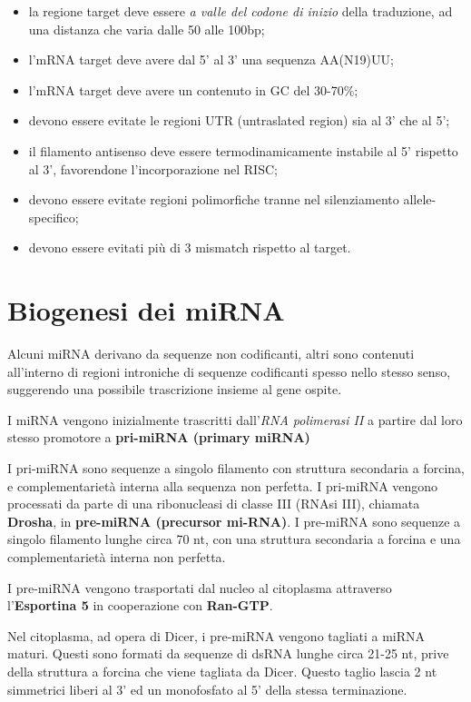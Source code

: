 \documentclass[11pt]{book}
\begin{document}
\begin{itemize}
\itemsep1pt\parskip0pt
\item
  la regione target deve essere \emph{a valle del codone di inizio}
  della traduzione, ad una distanza che varia dalle 50 alle 100bp;
\item
  l'mRNA target deve avere dal 5' al 3' una sequenza AA(N19)UU;
\item
  l'mRNA target deve avere un contenuto in GC del 30-70\%;
\item
  devono essere evitate le regioni UTR (untraslated region) sia al 3'
  che al 5';
\item
  il filamento antisenso deve essere termodinamicamente instabile al 5'
  rispetto al 3', favorendone l'incorporazione nel RISC;
\item
  devono essere evitate regioni polimorfiche tranne nel silenziamento
  allele-specifico;
\item
  devono essere evitati più di 3 mismatch rispetto al target.
\end{itemize}

\section{Biogenesi dei miRNA}\label{biogenesi-dei-mirna}

Alcuni miRNA derivano da sequenze non codificanti, altri sono contenuti
all'interno di regioni introniche di sequenze codificanti spesso nello
stesso senso, suggerendo una possibile trascrizione insieme al gene
ospite.

I miRNA vengono inizialmente trascritti dall'\emph{RNA polimerasi II} a
partire dal loro stesso promotore a \textbf{pri-miRNA (primary miRNA)}

I pri-miRNA sono sequenze a singolo filamento con struttura secondaria a
forcina, e complementarietà interna alla sequenza non perfetta. I
pri-miRNA vengono processati da parte di una ribonucleasi di classe III
(RNAsi III), chiamata \textbf{Drosha}, in \textbf{pre-miRNA (precursor
mi-RNA)}. I pre-miRNA sono sequenze a singolo filamento lunghe circa 70
nt, con una struttura secondaria a forcina e una complementarietà
interna non perfetta.

I pre-miRNA vengono trasportati dal nucleo al citoplasma attraverso
l'\textbf{Esportina 5} in cooperazione con \textbf{Ran-GTP}.

Nel citoplasma, ad opera di Dicer, i pre-miRNA vengono tagliati a miRNA
maturi. Questi sono formati da sequenze di dsRNA lunghe circa 21-25 nt,
prive della struttura a forcina che viene tagliata da Dicer. Questo
taglio lascia 2 nt simmetrici liberi al 3' ed un monofosfato al 5' della
stessa terminazione.
\end{document}
